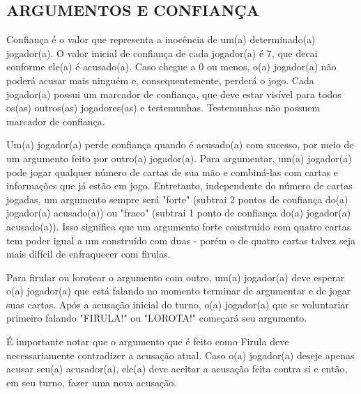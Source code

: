 \documentclass[a4paper, 11pt]{article}
\begin{document}
\subsection*{ARGUMENTOS E CONFIANÇA}

	Confiança é o valor que representa a inocência de um(a) determinado(a) jogador(a). O valor inicial de confiança de cada jogador(a) é 7, que decai conforme ele(a) é acusado(a). Caso chegue a 0 ou menos, o(a) jogador(a) não poderá acusar mais ninguém e, consequentemente, perderá o jogo. Cada jogador(a) possui um marcador de confiança, que deve estar visível para todos os(as) outros(as) jogadores(as) e testemunhas. Testemunhas não possuem marcador de confiança.

	Um(a) jogador(a) perde confiança quando é acusado(a) com sucesso, por meio de um argumento feito por outro(a) jogador(a). Para argumentar, um(a) jogador(a) pode jogar qualquer número de cartas de sua mão e combiná-las com cartas e informações que já estão em jogo. Entretanto, independente do número de cartas jogadas, um argumento sempre será "forte" (subtrai 2 pontos de confiança do(a) jogador(a) acusado(a)) ou "fraco" (subtrai 1 ponto de confiança do(a) jogador(a) acusado(a)). Isso significa que um argumento forte construído com quatro cartas tem poder igual a um construído com duas - porém o de quatro cartas talvez seja mais difícil de enfraquecer com firulas.


	Para firular ou lorotear o argumento com outro, um(a) jogador(a) deve esperar o(a) jogador(a) que está falando no momento terminar de argumentar e de jogar suas cartas. Após a acusação inicial do turno, o(a) jogador(a) que se voluntariar primeiro falando "FIRULA!" ou "LOROTA!" começará seu argumento.

	É importante notar que o argumento que é feito como Firula deve necessariamente contradizer a acusação atual. Caso o(a) jogador(a) deseje apenas acusar seu(a) acusador(a), ele(a) deve aceitar a acusação feita contra si e então, em seu turno, fazer uma nova acusação.

\end{document}
